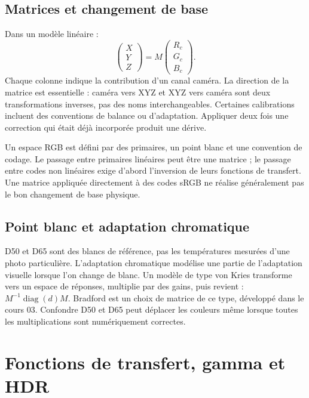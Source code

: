 \subsection{Matrices et changement de base}
Dans un modèle linéaire :
\begin{equation}
\begin{pmatrix}X\\Y\\Z\end{pmatrix}=M
\begin{pmatrix}R_c\\G_c\\B_c\end{pmatrix}.
\end{equation}
Chaque colonne indique la contribution d'un canal caméra.
La direction de la matrice est essentielle : caméra vers
XYZ et XYZ vers caméra sont deux transformations inverses,
pas des noms interchangeables. Certaines calibrations
incluent des conventions de balance ou d'adaptation.
Appliquer deux fois une correction qui était déjà incorporée
produit une dérive.

Un espace RGB est défini par des primaires, un point blanc
et une convention de codage. Le passage entre primaires
linéaires peut être une matrice ; le passage entre codes
non linéaires exige d'abord l'inversion de leurs fonctions
de transfert. Une matrice appliquée directement à des
codes sRGB ne réalise généralement pas le bon changement
de base physique.

\subsection{Point blanc et adaptation chromatique}
D50 et D65 sont des blancs de référence, pas les températures
mesurées d'une photo particulière. L'adaptation chromatique
modélise une partie de l'adaptation visuelle lorsque l'on
change de blanc. Un modèle de type von Kries transforme
vers un espace de réponses, multiplie par des gains, puis
revient : $M^{-1}\operatorname{diag}(d)M$.
Bradford est un choix de matrice de ce type, développé dans
le cours 03. Confondre D50 et D65 peut déplacer les couleurs
même lorsque toutes les multiplications sont numériquement
correctes.

\section{Fonctions de transfert, gamma et HDR}
